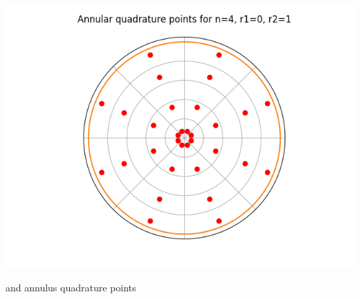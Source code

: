 \documentclass[10pt,a4paper]{letter}
\begin{document}
\includegraphics[scale=.5]{disk_n4}


and annulus quadrature points\\
\end{document}
